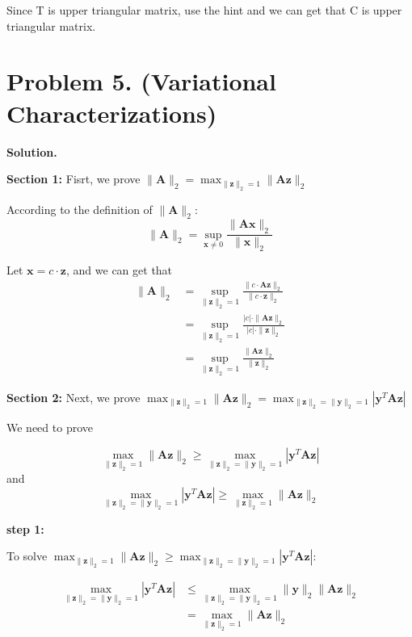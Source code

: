 \documentclass{article}
\newcommand{\x}{{\mathbf{x}}} %
\newcommand{\z}{{\mathbf{z}}} %
\newcommand{\0}{{\mathbf{0}}} %
\begin{document}
Since T is upper triangular matrix, use the hint and we can get that C is upper triangular matrix.

\section*{Problem 5. (Variational Characterizations)}

\textbf{Solution.}

\textbf{Section 1:}
Fisrt, we prove
$\|\mathbf{A}\|_2 = \max_{\|\mathbf{z}\|_2=1} \|\mathbf{A}\mathbf{z}\|_2$

According to the definition of $\|\mathbf{A}\|_2$:
$$
\|\mathbf{A}\|_2 = \sup_{\mathbf{x} \neq 0} \frac{\|\mathbf{A}\mathbf{x}\|_2}{\|\mathbf{x}\|_2}
$$

Let $\x = c \cdot \z$, and we can get that
\begin{align*}
\|\mathbf{A}\|_2 &= \sup_{\|\mathbf{z}\|_2=1} \frac{\|c \cdot \mathbf{A}\mathbf{z}\|_2}{\|c \cdot \mathbf{z}\|_2} \\
&= \sup_{\|\mathbf{z}\|_2=1} \frac{|c| \cdot \| \mathbf{A}\mathbf{z}\|_2}{|c| \cdot \|\mathbf{z}\|_2} \\
&= \sup_{\|\mathbf{z}\|_2=1} \frac{\| \mathbf{A}\mathbf{z}\|_2}{\|\mathbf{z}\|_2}
\end{align*}

\textbf{Section 2:}
Next, we prove $\max_{\|\mathbf{z}\|_2=1} \|\mathbf{A}\mathbf{z}\|_2 = \max_{\|\mathbf{z}\|_2=\|\mathbf{y}\|_2=1} |\mathbf{y}^T \mathbf{A}\mathbf{z}|$

We need to prove

$$\max_{\|\mathbf{z}\|_2=1} \|\mathbf{A}\mathbf{z}\|_2 \geq \max_{\|\mathbf{z}\|_2=\|\mathbf{y}\|_2=1} |\mathbf{y}^T \mathbf{A}\mathbf{z}|$$
and
$$\max_{\|\mathbf{z}\|_2=\|\mathbf{y}\|_2=1} |\mathbf{y}^T \mathbf{A}\mathbf{z}| \geq \max_{\|\mathbf{z}\|_2=1} \|\mathbf{A}\mathbf{z}\|_2$$

\textbf{step 1:}

To solve $\max_{\|\mathbf{z}\|_2=1} \|\mathbf{A}\mathbf{z}\|_2 \geq \max_{\|\mathbf{z}\|_2=\|\mathbf{y}\|_2=1} |\mathbf{y}^T \mathbf{A}\mathbf{z}|$:

\begin{align*}
\max_{\|\mathbf{z}\|_2=\|\mathbf{y}\|_2=1} |\mathbf{y}^T \mathbf{A}\mathbf{z}| &\leq \max_{\|\mathbf{z}\|_2=\|\mathbf{y}\|_2=1} \|\mathbf{y}\|_2 \|\mathbf{A}\mathbf{z}\|_2 \\
&= \max_{\|\mathbf{z}\|_2=1}\|\mathbf{A}\mathbf{z}\|_2
\end{align*}
\end{document}
